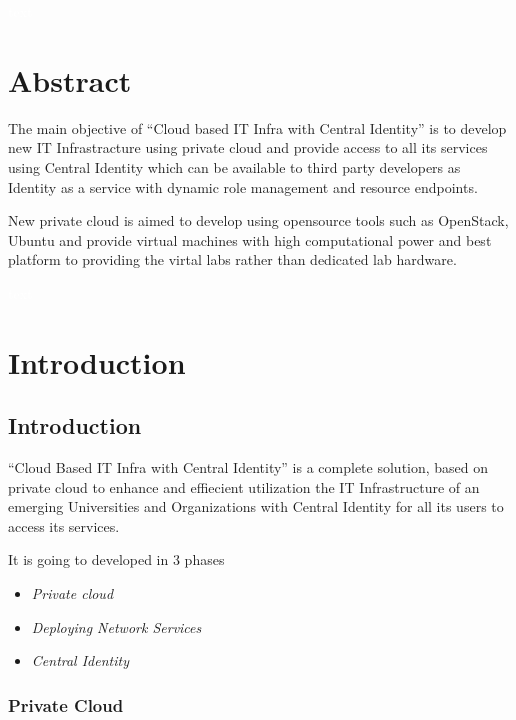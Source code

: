 \documentclass[12pt]{report}
\begin{document}
 \pagebreak \thispagestyle{empty} \textcolor{white}{text} \pagebreak
 
\chapter*{Abstract}
\setcounter{page}{1}
\normalsize
\hspace{0.5cm} The main objective of ``Cloud based IT Infra with Central Identity'' is to develop new IT Infrastracture using private cloud and provide access to all its services using 
Central Identity which can be available to third party developers  as Identity as a service with dynamic role management and resource endpoints. \newline

New private cloud is aimed to develop using opensource tools such as OpenStack, Ubuntu and provide  virtual machines with high computational power and best platform to providing the virtal labs rather than dedicated lab hardware.

\pagebreak \thispagestyle{empty} \textcolor{white}{text} \pagebreak
\setcounter{page}{2}
\tableofcontents
\pagebreak \thispagestyle{empty} \pagebreak

 
\setcounter{page}{1}


\chapter{Introduction}

\section{Introduction}
	``Cloud Based IT Infra with Central Identity'' is a complete solution, based on private cloud to enhance and effiecient utilization the IT Infrastructure of an emerging Universities and Organizations with Central Identity for all its users to access its services.\newline

	It is going to developed in 3 phases 
	\begin{itemize}
		\item \textit{Private cloud} 
		\item \textit{Deploying Network Services} 
		\item \textit{Central Identity}
	\end{itemize}
	
\subsection{Private Cloud}
\end{document}
